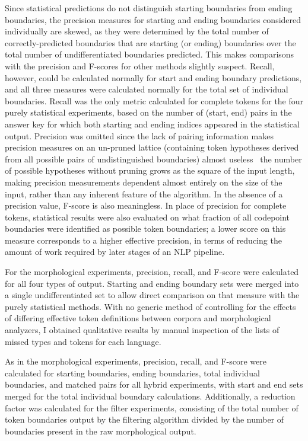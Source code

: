 Since statistical predictions do not distinguish starting boundaries from ending boundaries, the precision measures for starting and ending boundaries considered individually are skewed, as they were determined by the total number of correctly-predicted boundaries that are starting (or ending) boundaries over the total number of undifferentiated boundaries predicted. This makes comparisons with the precision and F-scores for other methods slightly suspect. Recall, however, could be calculated normally for start and ending boundary predictions, and all three measures were calculated normally for the total set of individual boundaries. Recall was the only metric calculated for complete tokens for the four purely statistical experiments, based on the number of (start, end) pairs in the answer key for which both starting and ending indices appeared in the statistical output. Precision was omitted since the lack of pairing information makes precision measures on an un-pruned lattice (containing token hypotheses derived from all possible pairs of undistinguished boundaries) almost useless\textemdash~ the number of possible hypotheses without pruning grows as the square of the input length, making precision measurements dependent almost entirely on the size of the input, rather than any inherent feature of the algorithm. In the absence of a precision value, F-score is also meaningless. In place of precision for complete tokens, statistical results were also evaluated on what fraction of all codepoint boundaries were identified as possible token boundaries; a lower score on this measure corresponds to a higher effective precision, in terms of reducing the amount of work required by later stages of an NLP pipeline.

For the morphological experiments, precision, recall, and F-score were calculated for all four types of output. Starting and ending boundary sets were merged into a single undifferentiated set to allow direct comparison on that measure with the purely statistical methods. With no generic method of controlling for the effects of differing effective token definitions between corpora and morphological analyzers, I obtained qualitative results by manual inspection of the lists of missed types and tokens for each language.

As in the morphological experiments, precision, recall, and F-score were calculated for starting boundaries, ending boundaries, total individual boundaries, and matched pairs for all hybrid experiments, with start and end sets merged for the total individual boundary calculations. Additionally, a reduction factor was calculated for the filter experiments, consisting of the total number of token boundaries output by the filtering algorithm divided by the number of boundaries present in the raw morphological output.